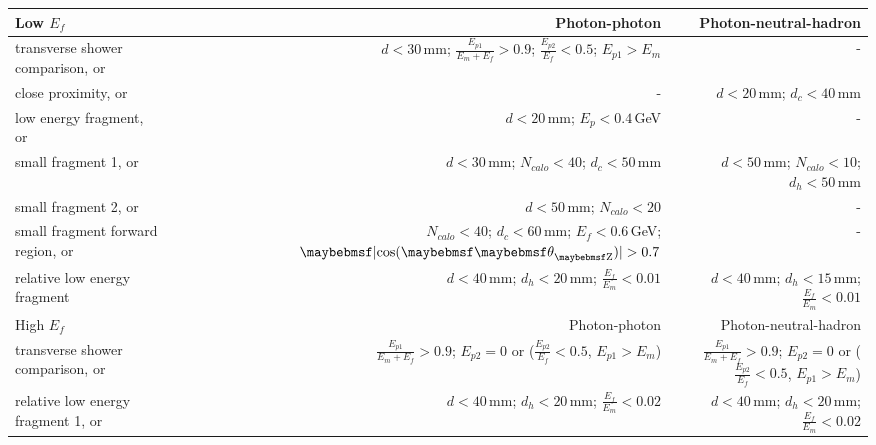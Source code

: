 \begin{table}[htbp]
\centering

\smallskip

\begin{tabular}{l  r  r }
\hline
\hline
Low $E_f$ &  Photon-photon & Photon-neutral-hadron \\
\hline
\multicolumn{1}{L{0.3\textwidth}}{transverse shower comparison, or} & \multicolumn{1}{R{0.3\textwidth}}{$d < 30 $\,mm; $\frac{E_{p1}}{E_m + E_f} > 0.9 $; $\frac{E_{p2}}{E_f} < 0.5 $; $E_{p1} > E_m$}  & \multicolumn{1}{R{0.3\textwidth}}{-} \\
\multicolumn{1}{L{0.3\textwidth}}{close proximity, or} & \multicolumn{1}{R{0.3\textwidth}}{-}  & \multicolumn{1}{R{0.3\textwidth}}{$d < 20 $\,mm; $d_c < 40 $\,mm} \\
\multicolumn{1}{L{0.3\textwidth}}{low energy fragment, or} & \multicolumn{1}{R{0.3\textwidth}}{$d < 20 $\,mm; $E_p < 0.4 $\,GeV}  & \multicolumn{1}{R{0.3\textwidth}}{-} \\
\multicolumn{1}{L{0.3\textwidth}}{small fragment 1, or} & \multicolumn{1}{R{0.3\textwidth}}{$d < 30 $\,mm; $N_{calo} < 40 $; $d_c < 50 $\,mm}  & \multicolumn{1}{R{0.3\textwidth}}{$d < 50 $\,mm; $N_{calo} < 10 $; $d_h < 50$\,mm} \\
\multicolumn{1}{L{0.3\textwidth}}{small fragment 2, or} & \multicolumn{1}{R{0.3\textwidth}}{$d < 50 $\,mm; $N_{calo} < 20 $}  & \multicolumn{1}{R{0.3\textwidth}}{-} \\
\multicolumn{1}{L{0.3\textwidth}}{small fragment forward region, or} & \multicolumn{1}{R{0.3\textwidth}}{$N_{calo} < 40$; $d_c < 60$\,mm; $E_f < 0.6$\,GeV; $\absCosTheta > 0.7$}  & \multicolumn{1}{R{0.3\textwidth}}{-} \\
\multicolumn{1}{L{0.3\textwidth}}{relative low energy fragment} & \multicolumn{1}{R{0.3\textwidth}}{$d < 40$\,mm; $d_h < 20$\,mm; $\frac{E_{f}}{E_m} < 0.01$}  & \multicolumn{1}{R{0.3\textwidth}}{$d < 40$\,mm; $d_h < 15$\,mm; $\frac{E_{f}}{E_m} < 0.01$} \\
\hline
High $E_f$ &  Photon-photon & Photon-neutral-hadron \\
\hline
\multicolumn{1}{L{0.3\textwidth}}{transverse shower comparison, or} & \multicolumn{1}{R{0.3\textwidth}}{$\frac{E_{p1}}{E_m + E_f} > 0.9 $; $E_{p2} = 0$ or ($\frac{E_{p2}}{E_f} < 0.5 $, $E_{p1} > E_m$)}  & \multicolumn{1}{R{0.3\textwidth}}{$\frac{E_{p1}}{E_m + E_f} > 0.9 $; $E_{p2} = 0$ or ($\frac{E_{p2}}{E_f} < 0.5 $, $E_{p1} > E_m$)} \\
\multicolumn{1}{L{0.3\textwidth}}{relative low energy fragment 1, or} & \multicolumn{1}{R{0.3\textwidth}}{$d < 40$\,mm; $d_h < 20$\,mm; $\frac{E_f}{E_m} < 0.02$} & \multicolumn{1}{R{0.3\textwidth}}{$d < 40$\,mm; $d_h < 20$\,mm; $\frac{E_f}{E_m} < 0.02$} \\

\end{tabular}
\end{table}
